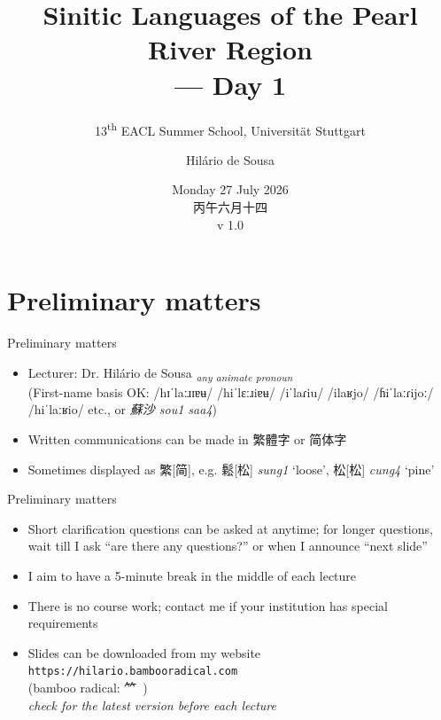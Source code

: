 \documentclass{beamer}
\title[Pearl River Sinitic]{Sinitic Languages of the Pearl River Region \\ --- Day 1}
\subtitle{13\textsuperscript{th} EACL Summer School, Universität Stuttgart}
\author{Hilário de Sousa}
\institute{EHESS–CRLAO}
\date{Monday 27 July 2026 \\ 丙午六月十四 \\ v 1.0}
\begin{document}
\begin{frame}
  \titlepage
\end{frame}


\section{Preliminary matters}

\begin{frame}{Preliminary matters}

\begin{itemize}
  \item Lecturer: Dr. Hilário de Sousa \textsubscript{\emph{any animate pronoun}} \\ (First-name basis OK: /hɪˈlaːɹɪɐʉ/ /hiˈlɛːɹiɐʉ/ /iˈlaɾiu/ /ilaʁjo/ /ɦiˈlaːɾijoː/ /hiˈlaːʁio/ etc., or \emph{蘇沙 sou1 saa4})
  \item Written communications can be made in 繁體字 or 简体字
  \item Sometimes displayed as 繁[简], e.g. 鬆[松] \emph{sung1} \enquote*{loose}, 松[松] \emph{cung4} \enquote*{pine}
\end{itemize}

\end{frame}

\begin{frame}{Preliminary matters}

\begin{itemize}
  \item Short clarification questions can be asked at anytime; for longer questions, wait till I ask \enquote{are there any questions?} or when I announce \enquote{next slide}
  \item I aim to have a 5-minute break in the middle of each lecture
  \item There is no course work; contact me if your institution has special requirements
  \item Slides can be downloaded from my website \texttt{https://hilario.bambooradical.com} \\ \quad (bamboo radical: ⺮\ ) \\ \quad \emph{check for the latest version before each lecture}
\end{itemize}

\end{frame}
\end{document}

